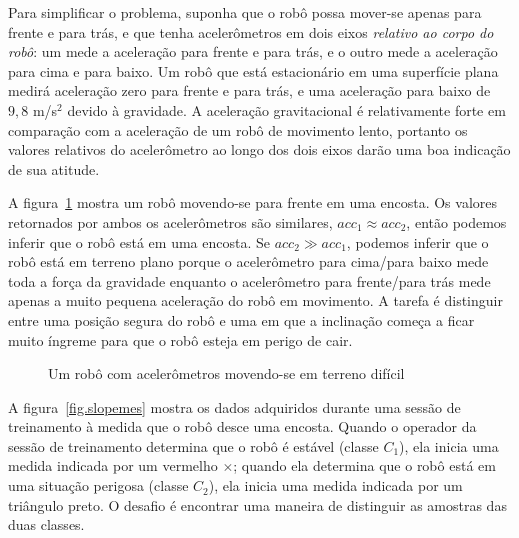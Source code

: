 Para simplificar o problema, suponha que o robô possa mover-se apenas para frente e para trás, e que tenha acelerômetros em dois eixos \emph{relativo ao corpo do robô}: um mede a aceleração para frente e para trás, e o outro mede a aceleração para cima e para baixo. Um robô que está estacionário em uma superfície plana medirá aceleração zero para frente e para trás, e uma aceleração para baixo de $9,8$ m/s$^{2}$ devido à gravidade. A aceleração gravitacional é relativamente forte em comparação com a aceleração de um robô de movimento lento, portanto os valores relativos do acelerômetro ao longo dos dois eixos darão uma boa indicação de sua atitude.

A figura~\ref{fig.slopes} mostra um robô movendo-se para frente em uma encosta. Os valores retornados por ambos os acelerômetros são similares, $\mathit{acc}_1\approx \mathit{acc}_2$, então podemos inferir que o robô está em uma encosta. Se $\mathit{acc}_2\gg \mathit{acc}_1$, podemos inferir que o robô está em terreno plano porque o acelerômetro para cima/para baixo mede toda a força da gravidade enquanto o acelerômetro para frente/para trás mede apenas a muito pequena aceleração do robô em movimento. A tarefa é distinguir entre uma posição segura do robô e uma em que a inclinação começa a ficar muito íngreme para que o robô esteja em perigo de cair.

\begin{figure}
\begin{center}
\end{center}
\caption{Um robô com acelerômetros movendo-se em terreno difícil}\label{fig.slopes}
\end{figure}

A figura~\ref{fig.slopemes} mostra os dados adquiridos durante uma sessão de treinamento à medida que o robô desce uma encosta. Quando o operador da sessão de treinamento determina que o robô é estável (classe $C_1$), ela inicia uma medida indicada por um vermelho $\times$; quando ela determina que o robô está em uma situação perigosa (classe $C_2$), ela inicia uma medida indicada por um triângulo preto. O desafio é encontrar uma maneira de distinguir as amostras das duas classes.

